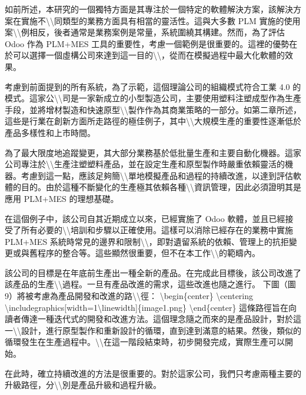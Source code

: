 如前所述，本研究的一個獨特方面是其專注於一個特定的軟體解決方案，該解決方案在實施不\textbackslash\textbackslash 同類型的業務方面具有相當的靈活性。這與大多數
PLM
實施的使用案\textbackslash\textbackslash 例相反，後者通常是業務案例是常量，系統圍繞其構建。然而，為了評估
Odoo 作為 PLM+MES
工具的重要性，考慮一個範例是很重要的。這裡的優勢在於可以選擇一個虛構公司來達到這一目的\textbackslash\textbackslash，從而在模擬過程中最大化軟體的效果。

考慮到前面提到的所有系統，為了示範，這個理論公司的組織模式符合工業 4.0
的模式。這家公\textbackslash\textbackslash 司是一家新成立的小型製造公司，主要使用塑料注塑成型作為生產手段，並將增材製造和快速原型\textbackslash\textbackslash 製作作為其商業策略的一部分。如第二章所述，這些是行業在創新方面所走路徑的極佳例子，其中\textbackslash\textbackslash 大規模生產的重要性逐漸低於產品多樣性和上市時間。

為了最大限度地追蹤變更，其大部分業務基於低批量生產和主要自動化機器。這家公司專注於\textbackslash\textbackslash 生產注塑塑料產品，並在設定生產和原型製作時嚴重依賴靈活的機器。考慮到這一點，應該足夠簡\textbackslash\textbackslash 單地模擬產品和過程的持續改進，以達到評估軟體的目的。由於這種不斷變化的生產極其依賴各種\textbackslash\textbackslash 資訊管理，因此必須證明其是應用
PLM+MES 的理想基礎。

在這個例子中，該公司自其近期成立以來，已經實施了 Odoo
軟體，並且已經接受了所有必要的\textbackslash\textbackslash 培訓和步驟以正確使用。這樣可以消除已經存在的業務中實施
PLM+MES
系統時常見的邊界和限制\textbackslash\textbackslash，即對遺留系統的依賴、管理上的抗拒變更或與舊程序的整合等。這些顯然很重要，但不在本工作\textbackslash\textbackslash 的範疇內。

該公司的目標是在年底前生產出一種全新的產品。在完成此目標後，該公司改進了該產品的生產\textbackslash\textbackslash 過程。一旦有產品改進的需求，這些改進也隨之進行。
下圖（圖
9）將被考慮為產品開發和改進的路\textbackslash\textbackslash 徑：
\textbackslash begin\{center\} \textbackslash centering
\textbackslash includegraphics{[}width=1\textbackslash linewidth{]}\{image1.png\}
\textbackslash end\{center\}
這條路徑旨在向讀者傳達一種迭代式的開發和改進方法。這個理念隨之而來的是產品設計，對於這一\textbackslash\textbackslash 設計，進行原型製作和重新設計的循環，直到達到滿意的結果。然後，類似的循環發生在生產過程中。\textbackslash\textbackslash 在這一階段結束時，初步開發完成，實際生產可以開始。

在此時，確立持續改進的方法是很重要的。對於這家公司，我們只考慮兩種主要的升級路徑，分\textbackslash\textbackslash 別是產品升級和過程升級。


